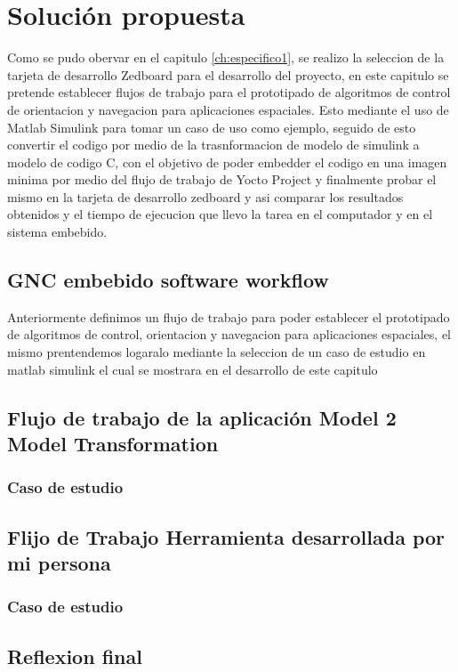 \chapter{Solución propuesta}
\label{ch:especifico2}

Como se pudo obervar en el capitulo \ref{ch:especifico1}, se realizo la seleccion de la tarjeta de desarrollo Zedboard para el desarrollo del proyecto, en este capitulo se pretende establecer flujos de trabajo para el prototipado de algoritmos de control de orientacion y navegacion para aplicaciones espaciales. Esto mediante el uso de Matlab Simulink para tomar un caso de uso como ejemplo, seguido de esto convertir el codigo por medio de la trasnformacion de modelo de simulink a modelo de codigo C, con el objetivo de poder embedder el codigo en una imagen minima por medio del flujo de trabajo de Yocto Project y finalmente probar el mismo en la tarjeta de desarrollo zedboard y asi comparar los resultados obtenidos y el tiempo de ejecucion que llevo la tarea en el computador y en el sistema embebido.

\section{GNC embebido software workflow}

Anteriormente definimos un flujo de trabajo para poder establecer el prototipado de algoritmos de control, orientacion y navegacion para aplicaciones espaciales, el mismo prentendemos logaralo mediante la seleccion de un caso de estudio en matlab simulink el cual se mostrara en el desarrollo de este capitulo

\section{Flujo de trabajo de la aplicación Model 2 Model Transformation}
\subsection{Caso de estudio}
\section{Flijo de Trabajo Herramienta desarrollada por mi persona}
\subsection{Caso de estudio}
\section{Reflexion final}